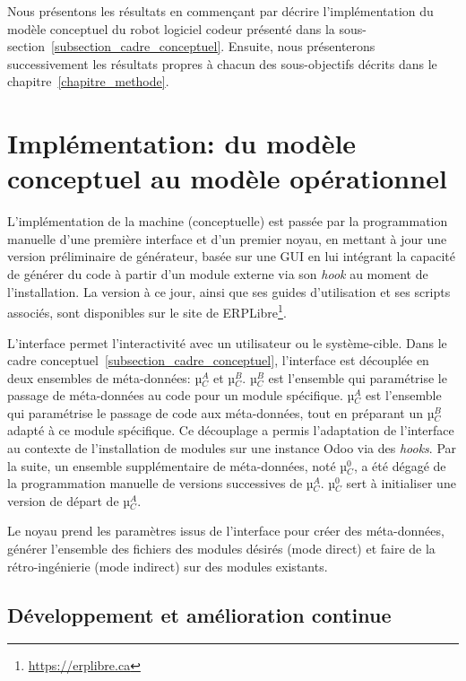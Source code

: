 \label{sec:Theme2}
Nous présentons les résultats en commençant par décrire l’implémentation du modèle conceptuel du robot logiciel codeur présenté dans la sous-section~\ref{subsection_cadre_conceptuel}. Ensuite, nous présenterons successivement les résultats propres à chacun des sous-objectifs décrits dans le chapitre~\ref{chapitre_methode}.

\section{Implémentation: du modèle conceptuel au modèle opérationnel}

L’implémentation de la machine (conceptuelle) est passée par la programmation manuelle d’une première interface et d’un premier noyau, en mettant à jour une version préliminaire de générateur, basée sur une GUI\cite{bluiksnot_repo} en lui intégrant la capacité de générer du code à partir d’un module externe via son \textit{hook} au moment de l’installation. La version à ce jour, ainsi que ses guides d’utilisation et ses scripts associés, sont disponibles sur le site de ERPLibre\footnote{\url{https://erplibre.ca}}.

L’interface permet l’interactivité avec un utilisateur ou le système-cible. Dans le cadre conceptuel~\ref{subsection_cadre_conceptuel}, l’interface est découplée en deux ensembles de méta-données: µ$_C^A$ et µ$_C^B$. µ$_C^B$ est l’ensemble qui paramétrise le passage de méta-données au code pour un module spécifique. µ$_C^A$ est l’ensemble qui paramétrise le passage de code aux méta-données, tout en préparant un µ$_C^B$ adapté à ce module spécifique. Ce découplage a permis l’adaptation de l’interface au contexte de l’installation de modules sur une instance Odoo via des \textit{hooks}. Par la suite, un ensemble supplémentaire de méta-données, noté µ$_C^0$, a été dégagé de la programmation manuelle de versions successives de µ$_C^A$. µ$_C^0$ sert à initialiser une version de départ de µ$_C^A$.

Le noyau prend les paramètres issus de l’interface pour créer des méta-données, générer l’ensemble des fichiers des modules désirés (mode direct) et faire de la rétro-ingénierie (mode indirect) sur des modules existants.

\subsection{Développement et amélioration continue}

